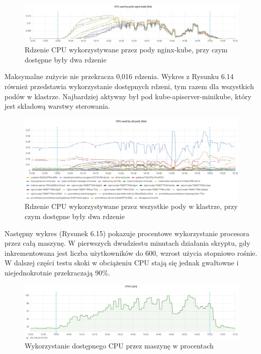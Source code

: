 \begin{figure}[H]
    \centering
    \includegraphics[width=1\textwidth]{img/test_one/cpu-nginx.png}
    \caption{Rdzenie CPU wykorzystywane przez pody nginx-kube, przy czym dostępne były dwa rdzenie}
\end{figure}

Maksymalne zużycie nie przekracza 0,016 rdzenia. Wykres z Rysunku 6.14 również przedstawia wykorzystanie dostępnych rdzeni, tym razem dla wszystkich podów w klastrze. Najbardziej aktywny był pod kube-apiserver-minikube, który jest składową warstwy sterowania.

\begin{figure}[H]
    \centering
    \includegraphics[width=1\textwidth]{img/test_one/cpu-all-pods.png}
    \caption{Rdzenie CPU wykorzystywane przez wszystkie pody w klastrze, przy czym dostępne były dwa rdzenie}
\end{figure}

Następny wykres (Rysunek 6.15) pokazuje procentowe wykorzystanie procesora przez całą maszynę. W pierwszych dwudziestu minutach działania skryptu, gdy inkrementowana jest liczba użytkowników do 600, wzrost użycia stopniowo rośnie. W dalszej części testu skoki w obciążeniu CPU stają się jednak gwałtowne i niejednokrotnie przekraczają 90\%. 

\begin{figure}[H]
    \centering
    \includegraphics[width=1\textwidth]{img/test_one/cpu-percent.png}
    \caption{Wykorzystanie dostępnego CPU przez maszynę w procentach}
\end{figure}

